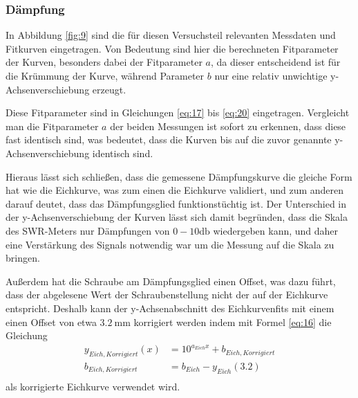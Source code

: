             \subsubsection{Dämpfung}
                In Abbildung \ref{fig:9} sind die für diesen Versuchsteil relevanten Messdaten und Fitkurven eingetragen.
                Von Bedeutung sind hier die berechneten Fitparameter der Kurven, besonders dabei der Fitparameter $a$, da dieser entscheidend ist für die Krümmung der Kurve, während Parameter $b$ nur eine relativ unwichtige y-Achsenverschiebung erzeugt.

                Diese Fitparameter sind in Gleichungen \eqref{eq:17} bis \eqref{eq:20} eingetragen.
                Vergleicht man die Fitparameter $a$ der beiden Messungen ist sofort zu erkennen, dass diese fast identisch sind, was bedeutet, dass die Kurven bis auf die zuvor genannte y-Achsenverschiebung identisch sind.

                Hieraus lässt sich schließen, dass die gemessene Dämpfungskurve die gleiche Form hat wie die Eichkurve, was zum einen die Eichkurve validiert, und zum anderen darauf deutet, dass das Dämpfungsglied funktionstüchtig ist.
                Der Unterschied in der y-Achsenverschiebung der Kurven lässt sich damit begründen, dass die Skala des SWR-Meters nur Dämpfungen von $0-10\si{\decibel}$ wiedergeben kann, und daher eine Verstärkung des Signals notwendig war um die Messung auf die Skala zu bringen.
                
                Außerdem hat die Schraube am Dämpfungsglied einen Offset, was dazu führt, dass der abgelesene Wert der Schraubenstellung nicht der auf der Eichkurve entspricht.
                Deshalb kann der y-Achsenabschnitt des Eichkurvenfits mit einem einen Offset von etwa $\SI{3.2}{\milli\metre}$ korrigiert werden indem mit Formel \ref{eq:16} die Gleichung 
                \begin{align}
                    y_{Eich,Korrigiert}(x) &= 10^{a_{Eich}x} + b_{Eich,Korrigiert} \label{eq:23} \\    
                    b_{Eich,Korrigiert} &= b_{Eich} - y_{Eich}(3.2)\\
                \end{align}
                als korrigierte Eichkurve verwendet wird.
                
